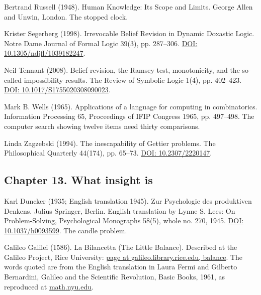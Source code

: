 \documentclass[11pt,twoside]{article}
\theoremstyle{thielethm}
\theoremstyle{thieledef}
\theoremstyle{thieledef}
\theoremstyle{thieledef}
\theoremstyle{thielethm}
\theoremstyle{thieleobs}
\theoremstyle{thielethm}
\begin{document}
\noindent Bertrand Russell (1948). Human Knowledge: Its Scope and Limits. George Allen and Unwin, London. The stopped clock.
\par\medskip

\noindent Krister Segerberg (1998). Irrevocable Belief Revision in Dynamic Doxastic Logic. Notre Dame Journal of Formal Logic 39(3), pp. 287--306. \href{https://doi.org/10.1305/ndjfl/1039182247}{DOI: 10.1305/ndjfl/1039182247}.
\par\medskip

\noindent Neil Tennant (2008). Belief-revision, the Ramsey test, monotonicity, and the so-called impossibility results. The Review of Symbolic Logic 1(4), pp. 402--423. \href{https://doi.org/10.1017/S1755020308090023}{DOI: 10.1017/S1755020308090023}.
\par\medskip

\noindent Mark B. Wells (1965). Applications of a language for computing in combinatorics. Information Processing 65, Proceedings of IFIP Congress 1965, pp. 497--498. The computer search showing twelve items need thirty comparisons.
\par\medskip

\noindent Linda Zagzebski (1994). The inescapability of Gettier problems. The Philosophical Quarterly 44(174), pp. 65--73. \href{https://doi.org/10.2307/2220147}{DOI: 10.2307/2220147}.
\par\medskip

\subsection*{Chapter 13. What insight is}

\noindent Karl Duncker (1935; English translation 1945). Zur Psychologie des produktiven Denkens. Julius Springer, Berlin. English translation by Lynne S. Lees: On Problem-Solving, Psychological Monographs 58(5), whole no. 270, 1945. \href{https://doi.org/10.1037/h0093599}{DOI: 10.1037/h0093599}. The candle problem.
\par\medskip

\noindent Galileo Galilei (1586). La Bilancetta (The Little Balance). Described at the Galileo Project, Rice University: \href{https://galileo.library.rice.edu/sci/instruments/balance.html}{page at galileo.library.rice.edu, balance}. The words quoted are from the English translation in Laura Fermi and Gilberto Bernardini, Galileo and the Scientific Revolution, Basic Books, 1961, as reproduced at \href{https://math.nyu.edu/Archimedes/Crown/bilancetta.html}{math.nyu.edu}.
\par\medskip
\end{document}
